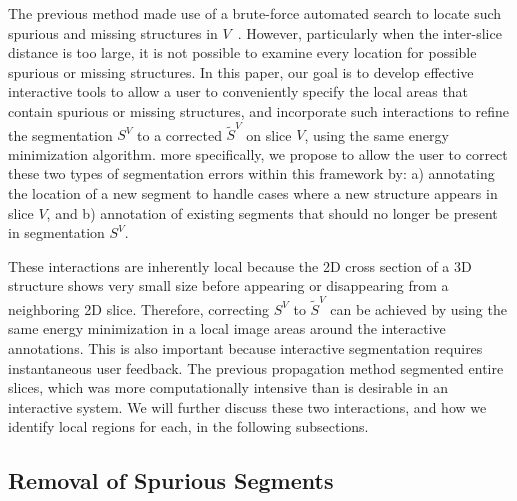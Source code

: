 \documentclass[]{spie}  %
\begin{document}
The previous method made use of a brute-force automated search to
locate such spurious and missing structures in $V$~\cite{waggoner:11}.
However, particularly when the inter-slice distance is too large, it
is not possible to examine every location for possible spurious or
missing structures.  In this paper, our goal is to develop effective
interactive tools to allow a user to conveniently specify the local
areas that contain spurious or missing structures, and incorporate
such interactions to refine the segmentation $S^V$ to a corrected
$\tilde{S}^V$ on slice $V$, using the same energy minimization
algorithm.  more specifically, we propose to allow the user to correct
these two types of segmentation errors within this framework by: a)
annotating the location of a new segment to handle cases where a new
structure appears in slice $V$, and b) annotation of existing segments
that should no longer be present in segmentation $S^V$.

These interactions are inherently local because the 2D cross section
of a 3D structure shows very small size before appearing or
disappearing from a neighboring 2D slice.  Therefore, correcting $S^V$
to $\tilde{S}^V$ can be achieved by using the same energy
minimization in a local image areas around the interactive
annotations.  This is also important because interactive segmentation
requires instantaneous user feedback.  The previous propagation method
segmented entire slices, which was more computationally intensive than
is desirable in an interactive system.  We will further discuss these
two interactions, and how we identify local regions for each, in the
following subsections.

\subsection{Removal of Spurious Segments}
\label{sec:remove}
\end{document}
